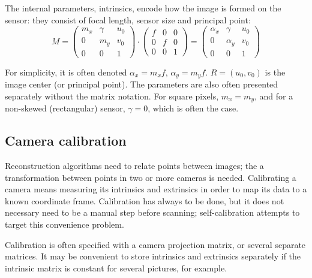 The internal parameters, intrinsics, encode how the image is formed on the sensor: they consist of focal length, sensor size and principal point:
\begin{equation}
	M =
	\begin{pmatrix}
		m_x & \gamma & u_0\\
		0   &    m_y & v_0\\
		0   &        0 & 1
	\end{pmatrix}
\cdot
	\begin{pmatrix}
		f & 0 & 0\\
		0 & f & 0\\
		0 & 0 & 1
	\end{pmatrix}
	=
	\begin{pmatrix}
		\alpha_x & \gamma   & u_0\\
		0        & \alpha_y & v_0\\
		0        & 0        & 1
	\end{pmatrix}
\end{equation}

For simplicity, it is often denoted $\alpha_x = m_x f$, $\alpha_y = m_y f$.
$R = (u_0, v_0)$ is the image center (or principal point).
The parameters are also often presented separately without the matrix notation.
For square pixels, $m_x = m_y$, and for a non-skewed (rectangular) sensor, $\gamma = 0$, which is often the case. \cite{hartley03multiview,szeliski10vision,heyden2005multiple}



\subsection{Camera calibration} %

Reconstruction algorithms need to relate points between images; the a transformation between points in two or more cameras is needed.
Calibrating a camera means measuring its intrinsics and extrinsics in order to map its data to a known coordinate frame.
Calibration has always to be done, but it does not necessary need to be a manual step before scanning;
self-calibration attempts to target this convenience problem. \cite{pollefeys1999hand,hartley03multiview}

Calibration is often specified with a camera projection matrix, or several separate matrices.
It may be convenient to store intrinsics and extrinsics separately if the intrinsic matrix is constant for several pictures, for example.

